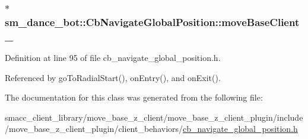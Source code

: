 \subsubsection[{\texorpdfstring{move\+Base\+Client\+\_\+}{moveBaseClient_}}]{ $\ast$ sm\+\_\+dance\+\_\+bot\+::\+Cb\+Navigate\+Global\+Position\+::move\+Base\+Client\+\_\+\hspace{0.3cm}{\ttfamily [private]}}\hypertarget{classsm__dance__bot_1_1CbNavigateGlobalPosition_a6b070ea39c113269c9b7f7732cb9e033}{}\label{classsm__dance__bot_1_1CbNavigateGlobalPosition_a6b070ea39c113269c9b7f7732cb9e033}


Definition at line 95 of file cb\+\_\+navigate\+\_\+global\+\_\+position.\+h.



Referenced by go\+To\+Radial\+Start(), on\+Entry(), and on\+Exit().



The documentation for this class was generated from the following file\+:\begin{DoxyCompactItemize}
\item 
smacc\+\_\+client\+\_\+library/move\+\_\+base\+\_\+z\+\_\+client/move\+\_\+base\+\_\+z\+\_\+client\+\_\+plugin/include/move\+\_\+base\+\_\+z\+\_\+client\+\_\+plugin/client\+\_\+behaviors/\hyperlink{smacc__client__library_2move__base__z__client_2move__base__z__client__plugin_2include_2move__base314f1b987667b08527fd8e96cdcf0a7}{cb\+\_\+navigate\+\_\+global\+\_\+position.\+h}\end{DoxyCompactItemize}

